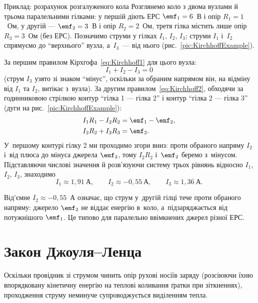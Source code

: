 \begin{Example}{Приклад: розрахунок розгалуженого кола}
Розглянемо коло з двома вузлами й трьома паралельними гілками: у першій діють ЕРС $\emf_1=6$~В і опір $R_1=1$~Ом, у другій --- $\emf_2=3$~В і опір $R_2=2$~Ом, третя гілка містить лише опір $R_3=3$~Ом (без ЕРС). Позначимо струми у гілках $I_1$, $I_2$, $I_3$; струми $I_1$ і~$I_2$
спрямуємо до \enquote{верхнього} вузла, а~$I_3$~--- від нього (рис.~\ref{pic:KirchhoffExample}).


За першим правилом Кірхгофа~\eqref{eq:Kirchhoff1} для цього вузла:
\begin{equation*}
	I_1 + I_2 - I_3 = 0
\end{equation*}
(струм $I_3$ узято зі знаком \enquote{мінус}, оскільки за обраним напрямом він, на відміну від $I_1$ та $I_2$, витікає з~вузла). За другим правилом~\eqref{eq:Kirchhoff2}, обходячи за годинниковою стрілкою контур \enquote{гілка 1 --- гілка 2} і контур \enquote{гілка 2 --- гілка 3}
(дуги на рис.~\ref{pic:KirchhoffExample}):
\begin{align*}
	I_1 R_1 - I_2 R_2 &= \emf_1 - \emf_2, \\
	I_2 R_2 + I_3 R_3 &= \emf_2.
\end{align*}
У~першому контурі гілку 2 ми проходимо згори вниз: проти обраного напряму $I_2$ і~від плюса до мінуса джерела $\emf_2$, тому
$I_2R_2$ і~$\emf_2$ беремо з~мінусом.
Підставляючи числові значення й розв'язуючи систему трьох рівнянь відносно $I_1$, $I_2$, $I_3$, знаходимо
\begin{equation*}
	I_1 \approx 1{,}91\ \text{А}, \qquad I_2 \approx -0{,}55\ \text{А}, \qquad I_3 \approx 1{,}36\ \text{А}.
\end{equation*}
\end{Example}


Від'ємне $I_2\approx -0{,}55$~А означає, що струм у~другій гілці тече проти обраного
напряму: джерело $\emf_2$ не віддає енергію в~коло, а~підзаряджається від потужнішого
$\emf_1$. Це типово для паралельно ввімкнених джерел різної ЕРС.

\section{Закон Джоуля--Ленца}\hypertarget{joule-lenz-law}{}

Оскільки провідник зі струмом чинить опір рухові носіїв заряду (розсіюючи їхню впорядковану кінетичну енергію на теплові коливання ґратки при
зіткненнях), проходження струму неминуче супроводжується виділенням тепла.

